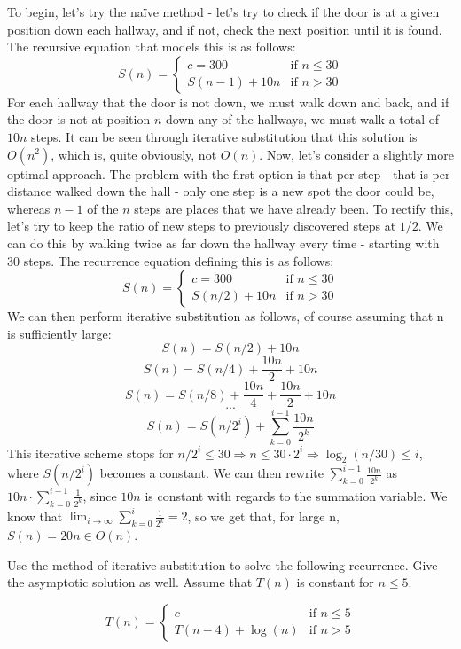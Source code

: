 \documentclass{article}
\begin{document}
\begin{solution}
To begin, let's try the naïve method - let's try to check if the door is at a given position down each hallway, and if not, check the next position until it is found.  The recursive equation that models this is as follows:
$$
S(n) = \begin{cases}
c = 300			& \text{if $n \leq 30$} \\
S(n-1) + 10n		& \text{if $n > 30$}
\end{cases}$$
For each hallway that the door is not down, we must walk down and back, and if the door is not at position $n$ down any of the hallways, we must walk a total of $10n$ steps.  It can be seen through iterative substitution that this solution is $O(n^2)$, which is, quite obviously, not $O(n)$.
\vskip 0.15in
Now, let's consider a slightly more optimal approach.  The problem with the first option is that per step - that is per distance walked down the hall - only one step is a new spot the door could be, whereas $n-1$ of the $n$ steps are places that we have already been.  To rectify this, let's try to keep the ratio of new steps to previously discovered steps at $1/2$.  We can do this by walking twice as far down the hallway every time - starting with 30 steps.  The recurrence equation defining this is as follows:
$$
S(n) = \begin{cases}
c = 300			& \text{if $n \leq 30$} \\
S(n/2) + 10n		& \text{if $n > 30$}
\end{cases}$$
We can then perform iterative substitution as follows, of course assuming that n is sufficiently large:
$$S(n) = S(n/2) + 10n$$
$$S(n) = S(n/4) + \frac{10n}{2} + 10n$$
$$S(n) = S(n/8) + \frac{10n}{4} + \frac{10n}{2} + 10n$$
$$\textbf{...}$$
$$S(n) = S(n/2^i) + \sum_{k = 0}^{i - 1} \frac{10n}{2^k}$$
This iterative scheme stops for $n/2^i \leq 30 \Rightarrow n \leq 30 \cdot 2^i \Rightarrow \log_2(n/30) \leq i$, where $S(n/2^i)$ becomes a constant.  We can then rewrite $\sum_{k=0}^{i-1} \frac{10n}{2^k}$ as $10n \cdot \sum_{k = 0}^{i-1} \frac{1}{2^k}$, since $10n$ is constant with regards to the summation variable. We know that $\lim_{i \to \infty} \sum_{k = 0}^{i} \frac{1}{2^k} = 2$, so we get that, for large n, $S(n) = 20n \in O(n)$.
\end{solution}

\vskip 0.25in


\begin{problem}  %
Use the method of iterative substitution to solve the following recurrence. Give the asymptotic solution as well. Assume that $T(n)$ is constant for $n \le 5$.

$$T(n)=  \begin{cases}
 c                 & \text {if $n\leq 5$} \\
T(n - 4) + \log(n)  & \text{if $n > 5$}
\end{cases}$$

\end{problem}
\end{document}
